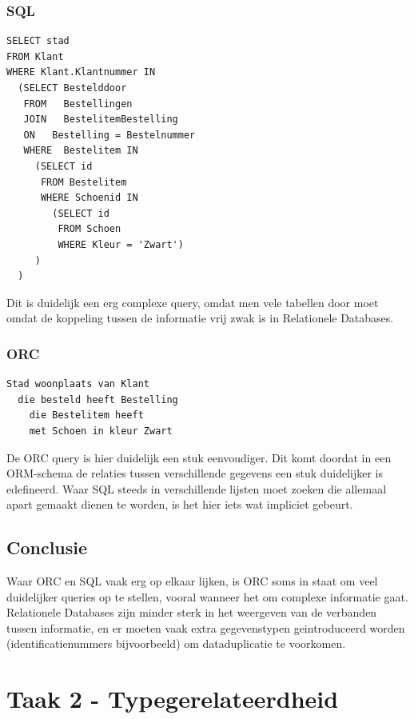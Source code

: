 \documentclass{article}
\begin{document}
\subsubsection{SQL}

\begin{verbatim}
SELECT stad
FROM Klant
WHERE Klant.Klantnummer IN 
  (SELECT Bestelddoor
   FROM   Bestellingen 
   JOIN   BestelitemBestelling
   ON   Bestelling = Bestelnummer
   WHERE  Bestelitem IN 
     (SELECT id 
      FROM Bestelitem
      WHERE Schoenid IN
        (SELECT id
         FROM Schoen
         WHERE Kleur = 'Zwart')
     )
  )   
\end{verbatim}

Dit is duidelijk een erg complexe query, omdat men vele tabellen door moet
omdat de koppeling tussen de informatie vrij zwak is in Relationele Databases.

\subsubsection{ORC}

\begin{verbatim}
Stad woonplaats van Klant 
  die besteld heeft Bestelling
    die Bestelitem heeft 
    met Schoen in kleur Zwart
\end{verbatim}

De ORC query is hier duidelijk een stuk eenvoudiger. Dit komt doordat in een
ORM-schema de relaties tussen verschillende gegevens een stuk duidelijker is
edefineerd. Waar SQL steeds in verschillende lijsten moet zoeken die allemaal
apart gemaakt dienen te worden, is het hier iets wat impliciet gebeurt.

\subsection{Conclusie} 

Waar ORC en SQL vaak erg op elkaar lijken, is ORC soms in staat om veel
duidelijker queries op te stellen, vooral wanneer het om complexe informatie
gaat. Relationele Databases zijn minder sterk in het weergeven van de verbanden
tussen informatie, en er moeten vaak extra gegevenstypen geintroduceerd worden
(identificatienummers bijvoorbeeld) om dataduplicatie te voorkomen.

\section{Taak 2 - Typegerelateerdheid}
\end{document}
